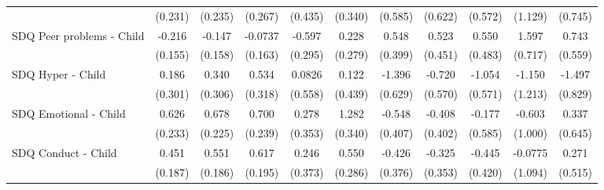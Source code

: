 {\begin{tabular}{l*{10}{c}}
            &     (0.231)         &     (0.235)         &     (0.267)         &     (0.435)         &     (0.340)         &     (0.585)         &     (0.622)         &     (0.572)         &     (1.129)         &     (0.745)         \\
\addlinespace
SDQ Peer problems - Child&      -0.216         &      -0.147         &     -0.0737         &      -0.597\sym{*}  &       0.228         &       0.548         &       0.523         &       0.550         &       1.597\sym{*}  &       0.743         \\
            &     (0.155)         &     (0.158)         &     (0.163)         &     (0.295)         &     (0.279)         &     (0.399)         &     (0.451)         &     (0.483)         &     (0.717)         &     (0.559)         \\
\addlinespace
SDQ Hyper - Child&       0.186         &       0.340         &       0.534         &      0.0826         &       0.122         &      -1.396\sym{*}  &      -0.720         &      -1.054         &      -1.150         &      -1.497         \\
            &     (0.301)         &     (0.306)         &     (0.318)         &     (0.558)         &     (0.439)         &     (0.629)         &     (0.570)         &     (0.571)         &     (1.213)         &     (0.829)         \\
\addlinespace
SDQ Emotional - Child&       0.626\sym{**} &       0.678\sym{**} &       0.700\sym{**} &       0.278         &       1.282\sym{***}&      -0.548         &      -0.408         &      -0.177         &      -0.603         &       0.337         \\
            &     (0.233)         &     (0.225)         &     (0.239)         &     (0.353)         &     (0.340)         &     (0.407)         &     (0.402)         &     (0.585)         &     (1.000)         &     (0.645)         \\
\addlinespace
SDQ Conduct - Child&       0.451\sym{*}  &       0.551\sym{**} &       0.617\sym{**} &       0.246         &       0.550         &      -0.426         &      -0.325         &      -0.445         &     -0.0775         &       0.271         \\
            &     (0.187)         &     (0.186)         &     (0.195)         &     (0.373)         &     (0.286)         &     (0.376)         &     (0.353)         &     (0.420)         &     (1.094)         &     (0.515)         \\
\bottomrule
\end{tabular}
}
